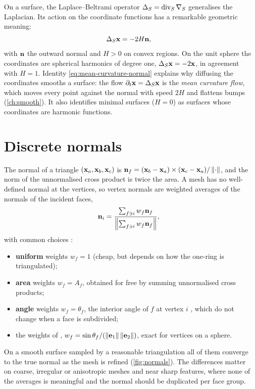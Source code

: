 On a surface, the Laplace--Beltrami operator $\Delta_S=\operatorname{div}_S\nabla_S$ generalises the Laplacian. Its
action on the coordinate functions has a remarkable geometric meaning:
\begin{equation}
\Delta_S\mathbf{x}=-2H\mathbf{n} ,
\label{eq:mean-curvature-normal}
\end{equation}
with $\mathbf{n}$ the outward normal and $H>0$ on convex regions. On the unit sphere the coordinates are
spherical harmonics of degree one, $\Delta_S\mathbf{x}=-2\mathbf{x}$, in agreement with $H=1$. Identity
\eqref{eq:mean-curvature-normal} explains why diffusing the coordinates smooths a surface: the
flow $\partial_t\mathbf{x}=\Delta_S\mathbf{x}$ is the \emph{mean curvature flow}, which moves every point against
the normal with speed $2H$ and flattens bumps (\cref{ch:smooth}). It also identifies minimal
surfaces ($H=0$) as surfaces whose coordinates are harmonic functions.

\section{Discrete normals}

The normal of a triangle $(\mathbf{x}_a,\mathbf{x}_b,\mathbf{x}_c)$ is
$\mathbf{n}_f=(\mathbf{x}_b-\mathbf{x}_a)\times(\mathbf{x}_c-\mathbf{x}_a)/\left\lVert \cdot\right\rVert$, and the norm of the unnormalised cross
product is twice the area. A mesh has no well-defined normal at the vertices, so vertex normals
are weighted averages of the normals of the incident faces,
\begin{equation}
\mathbf{n}_i=\frac{\sum_{f\ni i}w_f\mathbf{n}_f}{\left\lVert \sum_{f\ni i}w_f\mathbf{n}_f\right\rVert},
\end{equation}
with common choices \citep{Jin2005}:
\begin{itemize}
  \item \textbf{uniform} weights $w_f=1$ (cheap, but depends on how the one-ring is triangulated);
  \item \textbf{area} weights $w_f=A_f$, obtained for free by summing unnormalised cross products;
  \item \textbf{angle} weights $w_f=\theta_f$, the interior angle of $f$ at vertex $i$
  \citep{Thurmer1998}, which do not change when a face is subdivided;
  \item the weights of \citet{Max1999}, $w_f=\sin\theta_f/(\left\lVert \mathbf{e}_1\right\rVert\left\lVert \mathbf{e}_2\right\rVert)$, exact for
  vertices on a sphere.
\end{itemize}
On a smooth surface sampled by a reasonable triangulation all of them converge to the true normal
as the mesh is refined (\cref{fig:normals}). The differences matter on coarse, irregular or
anisotropic meshes and near sharp features, where none of the averages is meaningful and the
normal should be duplicated per face group.

